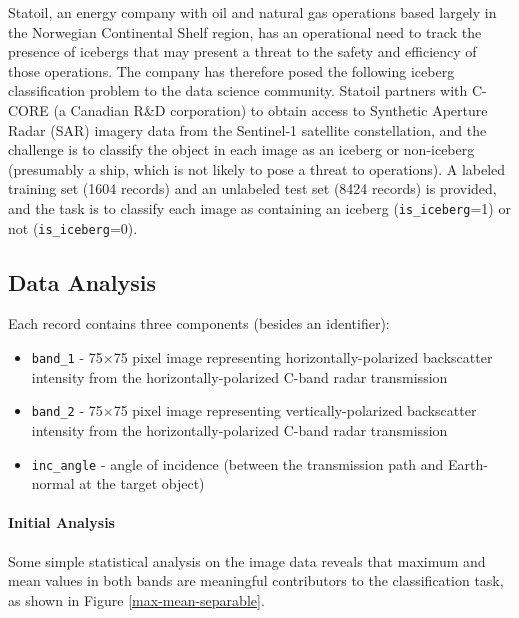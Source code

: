\documentclass[fleqn,10pt]{SelfArx} %
\begin{document}
Statoil, an energy company with oil and natural gas operations based largely in the Norwegian Continental Shelf region, has an operational need to track the presence of icebergs that may present a threat to the safety and efficiency of those operations. \cite{statoil} The company has therefore posed the following iceberg classification problem to the data science community.  Statoil partners with C-CORE (a Canadian R\&D corporation) to obtain access to Synthetic Aperture Radar (SAR) imagery data from the Sentinel-1 satellite constellation, and the challenge is to classify the object in each image as an iceberg or non-iceberg (presumably a ship, which is not likely to pose a threat to operations). A labeled training set (1604 records) and an unlabeled test set (8424 records) is provided, and the task is to classify each image as containing an iceberg (\texttt{is\_iceberg}=1) or not (\texttt{is\_iceberg}=0). \cite{kaggle-ice}

\subsection{Data Analysis}
Each record contains three components (besides an identifier):

\begin{itemize}
	\item \texttt{band\_1} - 75$\times$75 pixel image representing horizontally-polarized backscatter intensity from the horizontally-polarized C-band radar transmission
	\item \texttt{band\_2} - 75$\times$75 pixel image representing vertically-polarized backscatter intensity from the horizontally-polarized C-band radar transmission
	\item \texttt{inc\_angle} - angle of incidence (between the transmission path and Earth-normal at the target object)
\end{itemize}

\paragraph{Initial Analysis} Some simple statistical analysis on the image data reveals that maximum and mean values in both bands are meaningful contributors to the classification task, as shown in Figure \ref{max-mean-separable}.
\end{document}

